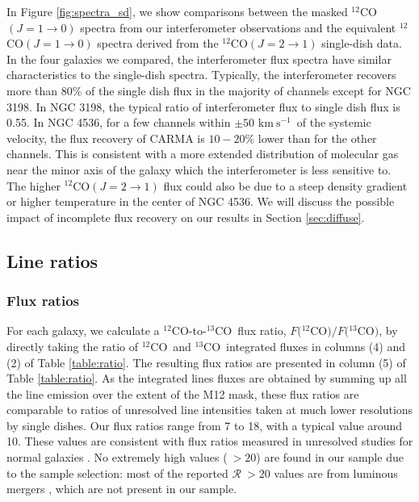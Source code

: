 \documentclass{emulateapj}
\def\ttco{\mbox{$^{13}$CO}}
\def\twco{\mbox{$^{12}$CO}}
\def\rtt{$\mathcal{R}$}
\newcommand{\kms}{$\mathrm{km~s^{-1}}$}
\begin{document}
In Figure \ref{fig:spectra_sd}, we show comparisons 
between the masked \twco$(J = 1 \rightarrow 0)$ spectra from 
our interferometer observations and the equivalent \twco$(J = 1
\rightarrow 0)$ spectra
derived from the \twco$(J = 2 \rightarrow 1)$ single-dish data. 
In the four galaxies we compared, 
the interferometer flux spectra have similar characteristics 
to the single-dish spectra. 
Typically, the interferometer recovers more than $80\%$ of the single
dish flux in the majority of channels except for NGC 3198. 
In NGC 3198, the typical ratio of interferometer flux to single 
dish flux is 0.55. In NGC 4536, for a few channels within $\pm 50$
\kms \ of the systemic 
velocity, the flux recovery of CARMA is $10-20\%$ lower than for the
other channels. This is consistent with a more extended distribution
of molecular gas near the minor axis of the galaxy which the 
interferometer is less sensitive to. 
The higher \twco$(J = 2 \rightarrow 1)$ flux could also be due to a steep density gradient or 
higher temperature in the center of NGC 4536. 
We will discuss the possible impact of incomplete flux
recovery on our results in 
Section \ref{sec:diffuse}.  

\subsection{Line ratios}

\subsubsection{Flux ratios} \label{sec:fluxr}

For each galaxy, we calculate a \twco-to-\ttco \ flux ratio,
$F($\twco$)/F($\ttco$)$, by directly taking the ratio of \twco \ and \ttco \ integrated
fluxes in columns (4) and (2) of Table \ref{table:ratio}.  
The resulting flux ratios are presented in column (5) of Table \ref{table:ratio}. 
As the integrated lines fluxes are obtained by summing up all the line emission over the 
extent of the M12 mask, these flux ratios are comparable to ratios of unresolved line 
intensities taken at much lower resolutions by single dishes. 
Our flux ratios range from 7 to 18, with a typical value around 10. 
These values are consistent with flux ratios measured in unresolved studies for 
normal galaxies \citep{Aalto1991, Aalto1995,Eckart1990, S&I1991, Y&S1986, Vila-Vilaro2015}.  
No extremely high values ($\ > 20$) are found in our sample due to the sample selection: 
most of the reported \rtt$\ >20$ values
are from luminous mergers \citep{Casoli1992,
  Aalto1991, Aalto2010}, which are not present in our sample. 
  
\end{document}
